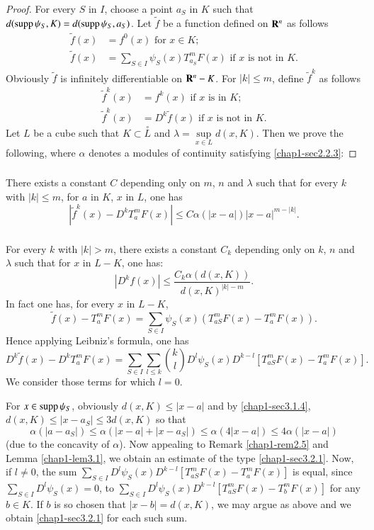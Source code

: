 \begin{proof}
For every $S$ in $I$, choose a point $a_{S}$ in $K$ such that $d(\operatorname{supp} \psi_{S},K)=d(\operatorname{supp} \psi_{S},a_{S})$. Let $\widetilde{f}$ be a function defined on $\mathbf{R}^{n}$ as follows
\begin{align*}
\widetilde{f}(x) &= f^{0}(x)\text{ for } x\in K;\\
\widetilde{f}(x) &= \sum\limits_{S\in I}\psi_{S}(x)T^{m}_{a_{S}}F(x)\text{ if $x$ is not in $K$.}
\end{align*}
Obviously $\widetilde{f}$ is infinitely differentiable on $\mathbf{R}^{n}-K$. For $|k|\leq m$, define $\widetilde{f}^{k}$ as follows
\begin{align*}
\widetilde{f}^{k}(x) &= f^{k}(x)\text{ if $x$ is in $K$;}\\
\widetilde{f}^{k}(x) &= D^{k}\widetilde{f}(x)\text{ if $x$ is not in $K$.}
\end{align*}
Let $L$ be a cube such that $K\subset \overset{\circ}{L}$ and $\lambda = \sup\limits_{x\in L}d(x,K)$. Then we prove the following, where $\alpha$ denotes a modules of continuity satisfying \eqref{chap1-sec2.2.3}:
\end{proof}

\setcounter{subsection}{2}
\setcounter{subsubsection}{0}
\subsubsection{}\label{chap1-sec3.2.1}
There exists a constant $C$ depending only on $m$, $n$ and $\lambda$ such that for every $k$ with $|k|\leq m$, for $a$ in $K$, $x$ in $L$, one has
$$
|\widetilde{f}^{k}(x)-D^{k}T^{m}_{a}F(x)|\leq C\alpha (|x-a|)|x-a|^{m-|k|}.
$$
\subsubsection{}\label{chap1-sec3.2.2}
For every $k$ with $|k|>m$, there exists a constant $C_{k}$ depending only on $k$, $n$ and $\lambda$ such that for $x$ in $L-K$, one has:
$$
|D^{k}f(x)|\leq \dfrac{C_{k}\alpha(d(x,K))}{d(x,K)^{|k|-m}}.
$$
In fact one has, for every $x$ in $L-K$,
$$
\widetilde{f}(x)-T^{m}_{a}F(x)=\sum\limits_{S\in I}\psi_{S}(x)(T^{m}_{aS}F(x)-T^{m}_{a}F(x)).
$$
Hence applying Leibniz's formula, one has
$$
D^{k}\widetilde{f}(x)-D^{k}T^{m}_{a}F(x)=\sum\limits_{S\in I}\sum\limits_{l\leq k}\binom{k}{l}D^{l}\psi_{S}(x)D^{k-l}[T^{m}_{aS}F(x)-T^{m}_{a}F(x)].
$$
We consider those terms for which $l=0$.

For $x\in \operatorname{supp} \psi_{S}$, obviously $d(x,K)\leq |x-a|$ and by \eqref{chap1-sec3.1.4}, $d(x,K)\leq |x-a_{S}|\leq 3d(x,K)$ so that
$$
\alpha(|a-a_{S}|)\leq \alpha(|x-a|+|x-a_{S}|)\leq \alpha(4|x-a|)\leq 4\alpha(|x-a|)
$$
(due to the concavity of $\alpha$). Now appealing to Remark \ref{chap1-rem2.5} and Lemma \ref{chap1-lem3.1}, we obtain an estimate of the type \eqref{chap1-sec3.2.1}. Now, if $l\neq 0$, the sum $\sum\limits_{S\in I}D^{l}\psi_{S}(x)D^{k-l}[T^{m}_{aS}F(x)-T^{m}_{a}F(x)]$ is equal, since $\sum\limits_{S\in I}D^{l}\psi_{S}(x)=0$, to $\sum\limits_{S\in I}D^{l}\psi_{S}(x)D^{k-l}[T^{m}_{aS}F(x)-T^{m}_{b}F(x)]$ for any $b\in K$. If $b$ is so chosen that $|x-b|=d(x,K)$, we may argue as above and we obtain \eqref{chap1-sec3.2.1} for each such sum.

